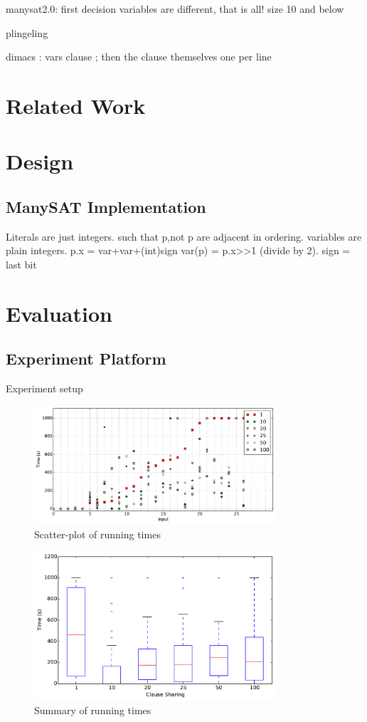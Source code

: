 \documentclass{article}
\begin{document}
manysat2.0: first decision variables are different, that is all! size 10 and below 

plingeling ~\cite{biere2010lingeling}

dimacs : vars clause ; then the clause themselves one per line 




\section{Related Work}


\section{Design}

\subsection{ManySAT Implementation}

Literals are just integers. such that p,not p are adjacent in ordering. 
variables are plain integers. p.x = var+var+(int)sign
var(p) = p.x>>1 (divide by 2). sign = last bit 


\section{Evaluation}


\subsection{Experiment Platform}
Experiment setup

\begin{figure}[h]
  \centering
  \includegraphics[width=0.8\textwidth]{../figs/scatter_all.pdf}
  \caption{Scatter-plot of running times}
  \label{fig:scatter-1}
\end{figure}

\begin{figure}[h]
  \centering
    \includegraphics[width=0.8\textwidth]{../figs/boxplot_all.pdf}
  \caption{Summary of running times}
  \label{fig:boxplot-1}
\end{figure}








\end{document}
